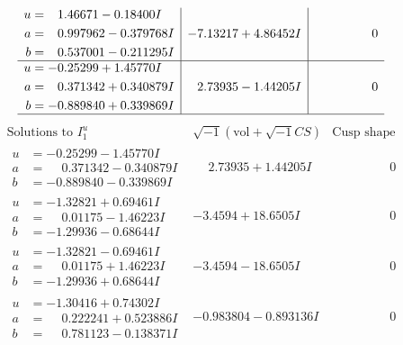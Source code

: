 \documentclass[1p]{elsarticle_modified}
\theoremstyle{definition}
\newcommand{\I}{\sqrt{-1}}
\begin{document}
$$\begin{array}{c|c|c}
\begin{aligned}
u &= \phantom{-}1.46671 - 0.18400 I \\
a &= \phantom{-}0.997962 - 0.379768 I \\
b &= \phantom{-}0.537001 - 0.211295 I\end{aligned}
 & -7.13217 + 4.86452 I & \phantom{-0.000000 } 0 \\ \hline\begin{aligned}
u &= -0.25299 + 1.45770 I \\
a &= \phantom{-}0.371342 + 0.340879 I \\
b &= -0.889840 + 0.339869 I\end{aligned}
 & \phantom{-}2.73935 - 1.44205 I & \phantom{-0.000000 } 0\\
 \hline 
 \end{array}$$\newpage$$\begin{array}{c|c|c}  
\text{Solutions to }I^u_{1}& \I (\text{vol} + \sqrt{-1}CS) & \text{Cusp shape}\\
 \hline 
\begin{aligned}
u &= -0.25299 - 1.45770 I \\
a &= \phantom{-}0.371342 - 0.340879 I \\
b &= -0.889840 - 0.339869 I\end{aligned}
 & \phantom{-}2.73935 + 1.44205 I & \phantom{-0.000000 } 0 \\ \hline\begin{aligned}
u &= -1.32821 + 0.69461 I \\
a &= \phantom{-}0.01175 - 1.46223 I \\
b &= -1.29936 - 0.68644 I\end{aligned}
 & -3.4594 + 18.6505 I & \phantom{-0.000000 } 0 \\ \hline\begin{aligned}
u &= -1.32821 - 0.69461 I \\
a &= \phantom{-}0.01175 + 1.46223 I \\
b &= -1.29936 + 0.68644 I\end{aligned}
 & -3.4594 - 18.6505 I & \phantom{-0.000000 } 0 \\ \hline\begin{aligned}
u &= -1.30416 + 0.74302 I \\
a &= \phantom{-}0.222241 + 0.523886 I \\
b &= \phantom{-}0.781123 - 0.138371 I\end{aligned}
 & -0.983804 - 0.893136 I & \phantom{-0.000000 } 0 \\ \hline\begin{aligned}

\end{aligned}
\end{array}$$
\end{document}
